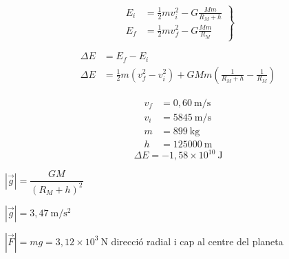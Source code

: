 \begin{solapartat}
\begin{minipage}[t]{0.55\linewidth}
\[ \left.\begin{aligned}
E_i &= \frac{1}{2}mv_i^2 - G\frac{Mm}{R_M + h}\\
E_f &= \frac{1}{2}mv_f^2 - G\frac{Mm}{R_M}
\end{aligned}\right\} \]
\end{minipage}\hfill
\begin{minipage}[t]{0.4\linewidth}
\vspace{0pt}
\end{minipage}

\begin{align*}
\Delta E &= E_f - E_i\\
\Delta E &= \frac{1}{2}m\left(v_f^2 - v_i^2\right) + GMm\left(\frac{1}{R_M + h} - \frac{1}{R_M}\right)
\end{align*}

\begin{align*}
v_f &= 0,60\ \mathrm{m/s}\\
v_i &= 5845\ \mathrm{m/s}\\
m &= 899\ \mathrm{kg}\\
h &= 125000\ \mathrm{m}
\end{align*}
\[ \Delta E = -1,58\times 10^{10}\ \mathrm{J} \]
\end{solapartat}

\begin{solapartat}
 $\left|\vec{g}\right| = \dfrac{GM}{\left(R_M + h\right)^2}$

 $\left|\vec{g}\right| = 3,47\ \mathrm{m/s^2}$

 $\left|\vec{F}\right| = mg = 3,12\times 10^{3}\ \mathrm{N}$ direcció radial i cap al centre del planeta
\end{solapartat}
